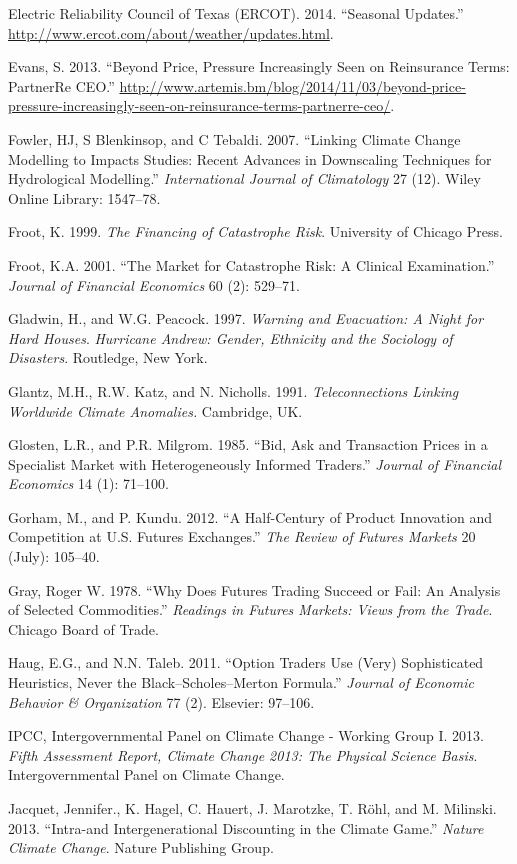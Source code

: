 \documentclass[article]{jss}
\begin{document}
Electric Reliability Council of Texas (ERCOT). 2014. ``Seasonal
Updates.'' \url{http://www.ercot.com/about/weather/updates.html}.

Evans, S. 2013. ``Beyond Price, Pressure Increasingly Seen on
Reinsurance Terms: PartnerRe CEO.''
\url{http://www.artemis.bm/blog/2014/11/03/beyond-price-pressure-increasingly-seen-on-reinsurance-terms-partnerre-ceo/}.

Fowler, HJ, S Blenkinsop, and C Tebaldi. 2007. ``Linking Climate Change
Modelling to Impacts Studies: Recent Advances in Downscaling Techniques
for Hydrological Modelling.'' \emph{International Journal of
Climatology} 27 (12). Wiley Online Library: 1547--78.

Froot, K. 1999. \emph{The Financing of Catastrophe Risk}. University of
Chicago Press.

Froot, K.A. 2001. ``The Market for Catastrophe Risk: A Clinical
Examination.'' \emph{Journal of Financial Economics} 60 (2): 529--71.

Gladwin, H., and W.G. Peacock. 1997. \emph{Warning and Evacuation: A
Night for Hard Houses}. \emph{Hurricane Andrew: Gender, Ethnicity and
the Sociology of Disasters}. Routledge, New York.

Glantz, M.H., R.W. Katz, and N. Nicholls. 1991. \emph{Teleconnections
Linking Worldwide Climate Anomalies.} Cambridge, UK.

Glosten, L.R., and P.R. Milgrom. 1985. ``Bid, Ask and Transaction Prices
in a Specialist Market with Heterogeneously Informed Traders.''
\emph{Journal of Financial Economics} 14 (1): 71--100.

Gorham, M., and P. Kundu. 2012. ``A Half-Century of Product Innovation
and Competition at U.S. Futures Exchanges.'' \emph{The Review of Futures
Markets} 20 (July): 105--40.

Gray, Roger W. 1978. ``Why Does Futures Trading Succeed or Fail: An
Analysis of Selected Commodities.'' \emph{Readings in Futures Markets:
Views from the Trade}. Chicago Board of Trade.

Haug, E.G., and N.N. Taleb. 2011. ``Option Traders Use (Very)
Sophisticated Heuristics, Never the Black--Scholes--Merton Formula.''
\emph{Journal of Economic Behavior \& Organization} 77 (2). Elsevier:
97--106.

{IPCC}, {Intergovernmental Panel on Climate Change - Working Group I}.
2013. \emph{Fifth Assessment Report, Climate Change 2013: The Physical
Science Basis}. Intergovernmental Panel on Climate Change.

Jacquet, Jennifer., K. Hagel, C. Hauert, J. Marotzke, T. R{ö}hl, and M.
Milinski. 2013. ``Intra-and Intergenerational Discounting in the Climate
Game.'' \emph{Nature Climate Change}. Nature Publishing Group.
\end{document}
